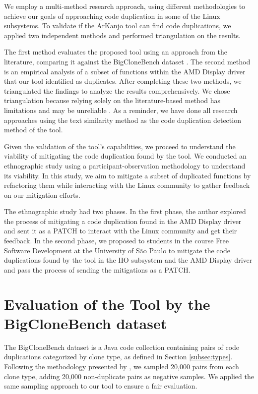 
We employ a multi-method research approach, using different methodologies to achieve our 
goals of approaching code duplication in some of the Linux subsystems. To validate if the 
ArKanjo tool can find code duplications, we applied two independent methods and performed 
triangulation on the results.

The first method evaluates the proposed tool using an approach from the literature, 
comparing it against the BigCloneBench dataset \citep{bigclonebench}. 
The second method is an empirical analysis of a subset of functions within the 
AMD Display driver that our tool identified as duplicates. After completing these two 
methods, we triangulated the findings to analyze the results comprehensively. 
We chose triangulation because relying solely on the literature-based method has 
limitations and may be unreliable \citep{bigfail, litreview}. 
As a reminder, we have done all research approaches using the text similarity method 
as the code duplication detection method of the tool.

Given the validation of the tool’s capabilities, we proceed to understand the viability 
of mitigating the code duplication found by the tool. We conducted an ethnographic study 
using a participant-observation methodology to understand its viability. In this study, 
we aim to mitigate a subset of duplicated functions by refactoring them while interacting 
with the Linux community to gather feedback on our mitigation efforts.

The ethnographic study had two phases. In the first phase, the author explored the process 
of mitigating a code duplication found in the AMD Display driver and sent it as a PATCH to 
interact with the Linux community and get their feedback. In the second phase, we proposed 
to students in the course Free Software Development at the University of São Paulo to mitigate 
the code duplications found by the tool in the IIO subsystem and the AMD Display driver and 
pass the process of sending the mitigations as a PATCH.

\section{Evaluation of the Tool by the BigCloneBench dataset}

\label{sec:metbig}

The BigCloneBench dataset \citep{bigclonebench} is a Java code collection containing pairs of code duplications categorized by clone type, as defined in Section \ref{subsec:types}.
%
Following the methodology presented by \citep{tailor}, we sampled 20,000 pairs from each clone type, adding 20,000 non-duplicate pairs as negative samples. We applied the same sampling approach to our tool to ensure a fair evaluation.

